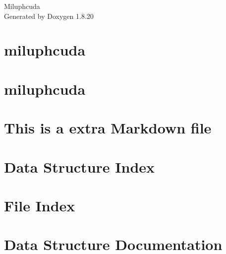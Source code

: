 \let\mypdfximage\pdfximage\def\pdfximage{\immediate\mypdfximage}\documentclass[twoside]{book}
\newcommand{\+}{\discretionary{\mbox{\scriptsize$\hookleftarrow$}}{}{}}
\newcommand{\clearemptydoublepage}{%
  \newpage{\pagestyle{empty}\cleardoublepage}%
}
\begin{document}
\hypersetup{pageanchor=false,
             bookmarksnumbered=true,
             pdfencoding=unicode
            }
\begin{titlepage}
\vspace*{7cm}
\begin{center}%
{\Large Miluphcuda }\\
\vspace*{1cm}
{\large Generated by Doxygen 1.8.20}\\
\end{center}
\end{titlepage}
\clearemptydoublepage
{}
\tableofcontents
\clearemptydoublepage
{}
\hypersetup{pageanchor=true}

\chapter{miluphcuda}
\label{index}\hypertarget{index}{}
\chapter{miluphcuda}
\label{md__r_e_a_d_m_e}

\chapter{This is a extra Markdown file}
\label{md_doc__extra_markdown}

\chapter{Data Structure Index}

\chapter{File Index}

\chapter{Data Structure Documentation}




\end{document}
